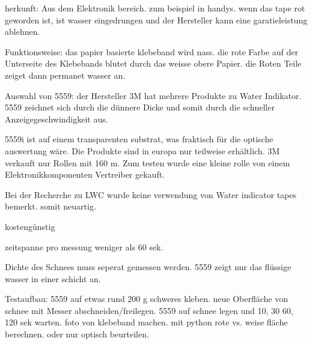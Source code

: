 herkunft: Aus dem Elektronik bereich. zum beispiel in handys. wenn das tape rot geworden ist, ist wasser eingedrungen und der Hersteller kann eine garatieleistung ablehnen.

Funktionsweise: das papier basierte klebeband wird nass. die rote Farbe auf der Unterseite des Klebebands blutet durch das weisse obere Papier. die Roten Teile zeiget dann permanet wasser an.

Auswahl von 5559: der Hersteller 3M hat mehrere Produkte zu Water Indikator. 5559 zeichnet sich durch die dünnere Dicke und somit durch die schneller Anzeigegeschwindigkeit aus.

5559i ist auf einem transparenten substrat, was fraktisch für die optische auswertung wäre. Die Produkte sind in europa nur teilweise erhältlich. 3M verkauft nur Rollen mit 160 m. Zum testen wurde eine kleine rolle von einem Elektronikkomponenten Vertreiber gekauft.

Bei der Recherche zu LWC wurde keine verwendung von Water indicator tapes bemerkt. somit neuartig.

kostengünstig

zeitspanne pro messung weniger als 60 sek.

Dichte des Schnees muss seperat gemessen werden. 5559 zeigt nur das flüssige wasser in einer schicht an.

Testaufbau: 5559 auf etwas rund 200 g schweres kleben. neue Oberfläche von schnee mit Messer abschneiden/freilegen. 5559 auf schnee legen und 10, 30 60, 120 sek warten. foto von klebeband machen. mit python rote vs. weise fläche berechnen. oder nur optisch beurteilen.
